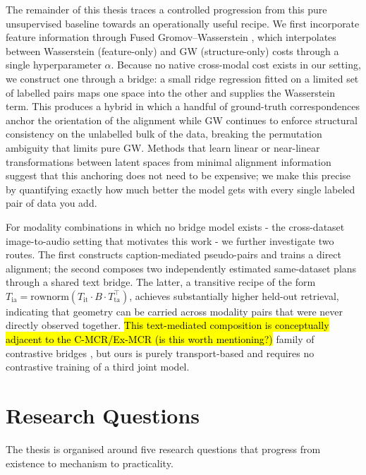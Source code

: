 The remainder of this thesis traces a controlled progression from this pure unsupervised baseline towards an operationally useful recipe. We first incorporate feature information through Fused Gromov--Wasserstein \cite{vayer2020fused}, which interpolates between Wasserstein (feature-only) and GW (structure-only) costs through a single hyperparameter $\alpha$. Because no native cross-modal cost exists in our setting, we construct one through a bridge: a small ridge regression \cite{hoerl1970ridge} fitted on a limited set of labelled pairs maps one space into the other and supplies the Wasserstein term. This produces a hybrid in which a handful of ground-truth correspondences anchor the orientation of the alignment while GW continues to enforce structural consistency on the unlabelled bulk of the data, breaking the permutation ambiguity that limits pure GW. Methods that learn linear or near-linear transformations between latent spaces from minimal alignment information \cite{moschella2023relative,maiorca2023latent} suggest that this anchoring does not need to be expensive; we make this precise by quantifying exactly how much better the model gets with every single labeled pair of data you add.

For modality combinations in which no bridge model exists - the cross-dataset image-to-audio setting that motivates this work - we further investigate two routes. The first constructs caption-mediated pseudo-pairs and trains a direct alignment; the second composes two independently estimated same-dataset plans through a shared text bridge. The latter, a transitive recipe of the form $T_{\text{ia}} = \mathrm{rownorm}(T_{\text{it}} \cdot B \cdot T_{\text{ta}}^\top)$, achieves substantially higher held-out retrieval, indicating that geometry can be carried across modality pairs that were never directly observed together. \hl{This text-mediated composition is conceptually adjacent to the C-MCR/Ex-MCR (is this worth mentioning?)} family of contrastive bridges \cite{wang2023cmcr,wang2023exmcr}, but ours is purely transport-based and requires no contrastive training of a third joint model.

\section{Research Questions}

The thesis is organised around five research questions that progress from existence to mechanism to practicality.

